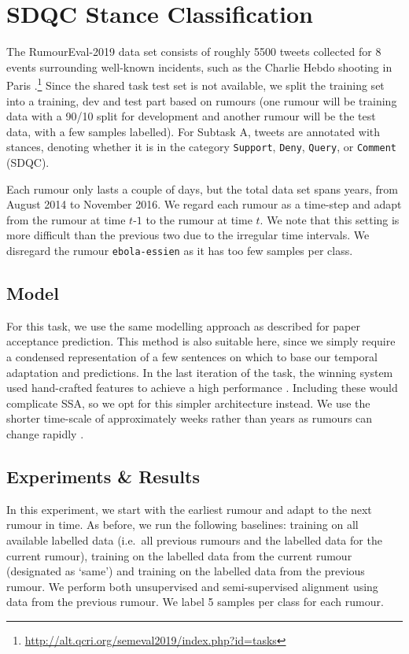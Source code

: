 \documentclass[letterpaper]{article} %
\begin{document}
\section{SDQC Stance Classification}
The RumourEval-2019 data set consists of roughly 5500 tweets collected for 8 events surrounding well-known incidents, such as the Charlie Hebdo shooting in Paris \cite{rumour:19}.\footnote{\url{http://alt.qcri.org/semeval2019/index.php?id=tasks}}
Since the shared task test set is not available, we split the training set into a training, dev and test part based on rumours (one rumour will be training data with a 90/10 split for development and another rumour will be the test data, with a few samples labelled). For Subtask A, tweets are annotated with stances, denoting whether it is in the category \texttt{Support}, \texttt{Deny}, \texttt{Query}, or \texttt{Comment} (SDQC).

Each rumour only lasts a couple of days, but the total data set spans years, from August 2014 to November 2016.  We regard each rumour as a time-step and adapt from the rumour at time $t$-$1$ to the rumour at time $t$. We note that this setting is more difficult than the previous two due to the irregular time intervals. We disregard the rumour \texttt{ebola-essien} as it has too few samples per class.

\subsection{Model}
For this task, we use the same modelling approach as described for paper acceptance prediction. %
This method is also suitable here, since we simply require a condensed representation of a few sentences on which to base our temporal adaptation and predictions.
In the last iteration of the task, the winning system used hand-crafted features to achieve a high performance \cite{S17-2083}. Including these would complicate SSA, so we opt for this simpler architecture instead.
We use the shorter time-scale of approximately weeks rather than years as rumours can change rapidly \cite{kwon2017rumor}.

\subsection{Experiments \& Results}
In this experiment, we start with the earliest rumour and adapt to the next rumour in time. As before, we run the following baselines: training on all available labelled data (i.e.~all previous rumours and the labelled data for the current rumour), training on the labelled data from the current rumour (designated as `same') and training on the labelled data from the previous rumour. We perform both unsupervised and semi-supervised alignment using data from the previous rumour. We label 5 samples per class for each rumour.
\end{document}
